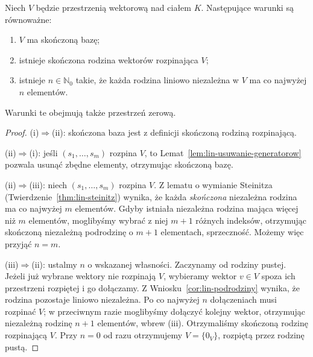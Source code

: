 \begin{twierdzenie}
\label{thm:lin-skonczona-wymiarowosc}
Niech \(V\) będzie przestrzenią wektorową
nad ciałem \(K\).
Następujące warunki są równoważne:
\begin{enumerate}[label=(\roman*)]
\item \(V\) ma skończoną bazę;
\item istnieje skończona rodzina wektorów rozpinająca \(V\);
\item istnieje \(n\in\mathbb N_0\) takie, że każda
rodzina liniowo niezależna w \(V\) ma co najwyżej
\(n\) elementów.
\end{enumerate}
Warunki te obejmują także przestrzeń zerową.
\end{twierdzenie}
\begin{proof}
(i)\(\Rightarrow\)(ii): skończona baza
jest z definicji skończoną rodziną rozpinającą.

(ii)\(\Rightarrow\)(i): jeśli
\((s_1,\ldots,s_m)\) rozpina \(V\),
to Lemat~\ref{lem:lin-usuwanie-generatorow}
pozwala usunąć zbędne elementy, otrzymując
skończoną bazę.

(ii)\(\Rightarrow\)(iii): niech
\((s_1,\ldots,s_m)\) rozpina \(V\).
Z lematu o wymianie Steinitza
(Twierdzenie~\ref{thm:lin-steinitz})
wynika, że każda \emph{skończona}
niezależna rodzina ma co najwyżej \(m\) elementów.
Gdyby istniała niezależna rodzina mająca
więcej niż \(m\) elementów, moglibyśmy
wybrać z niej \(m+1\) różnych indeksów,
otrzymując skończoną niezależną podrodzinę
o \(m+1\) elementach, sprzeczność.
Możemy więc przyjąć \(n=m\).

(iii)\(\Rightarrow\)(ii): ustalmy \(n\)
o wskazanej własności.
Zaczynamy od rodziny pustej.
Jeżeli już wybrane wektory nie rozpinają
\(V\), wybieramy wektor \(v\in V\)
spoza ich przestrzeni rozpiętej i go dołączamy.
Z Wniosku~\ref{cor:lin-podrodziny}
wynika, że rodzina pozostaje liniowo niezależna.
Po co najwyżej \(n\) dołączeniach musi
rozpinać \(V\); w przeciwnym razie
moglibyśmy dołączyć kolejny wektor,
otrzymując niezależną rodzinę
\(n+1\) elementów, wbrew (iii).
Otrzymaliśmy skończoną rodzinę
rozpinającą \(V\). Przy \(n=0\)
od razu otrzymujemy \(V=\{0_V\}\),
rozpiętą przez rodzinę pustą.
\end{proof}

